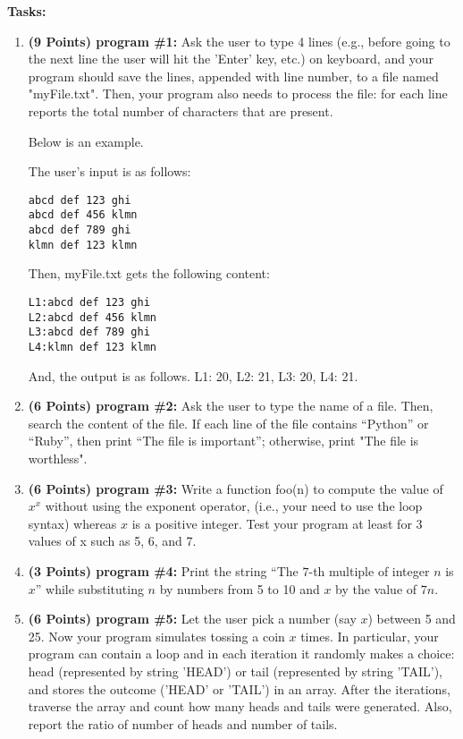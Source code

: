 \documentclass[paper=letter, fontsize=11pt]{scrartcl} %
\begin{document}
    \textbf{Tasks:}
    \begin{enumerate}[noitemsep]

        \item \textbf{(9 Points) program \#1:} Ask the user to type 4 lines 
(e.g., before going to the next line the user will hit the 'Enter' key, etc.) 
on keyboard, and your program should save the lines, appended with line number, to a file named "myFile.txt". 
Then, your program also needs to process the file: for each line reports the total number of characters 
that are present.

Below is an example. 

The user's input is as follows: 

\texttt{abcd def 123 ghi}\\
\texttt{abcd def 456 klmn}\\
\texttt{abcd def 789 ghi}\\
\texttt{klmn def 123 klmn}

Then, myFile.txt gets the following content:

\texttt{L1:abcd def 123 ghi}\\
\texttt{L2:abcd def 456 klmn}\\
\texttt{L3:abcd def 789 ghi}\\
\texttt{L4:klmn def 123 klmn}

And, the output is as follows.
L1: 20, L2: 21, L3: 20, L4: 21.

        \item \textbf{(6 Points) program \#2:} Ask the user to type the name of a file. 
Then, search the content of the file. 
If each line of the file contains 
``Python'' or ``Ruby'', then print ``The file is important'';
otherwise, print "The file is worthless". 

        \item \textbf{(6 Points) program \#3:} Write a function foo(n) to compute the value of $x^x$ without 
using the exponent operator, (i.e., your need to use the loop syntax) whereas $x$ is a positive integer. 
Test your program at least for 3 values of x such as 5, 6, and 7.

        \item \textbf{(3 Points) program \#4:} Print the string ``The $7$-th multiple of integer $n$ is $x$'' 
while substituting $n$ by numbers from 5 to 10 and $x$ by the value of $7n$.
        \item \textbf{(6 Points) program \#5:} Let the user pick a number (say $x$) between 5 and 25. 
Now your program simulates tossing a coin $x$ times. 
In particular, your program can contain a loop and in each iteration it randomly makes a choice: 
head (represented by string 'HEAD') or 
tail (represented by string 'TAIL'), and stores the outcome ('HEAD' or 'TAIL') 
in an array. After the iterations, traverse the array and count how many heads and tails were generated. 
Also, report the ratio of number of heads and number of tails.


\end{enumerate}
\end{document}
